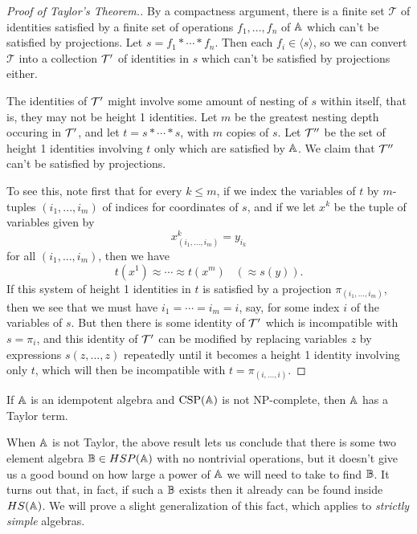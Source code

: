 \documentclass[letterpaper,11pt]{article}
\DeclareMathOperator{\CSP}{CSP}
\begin{document}
\begin{proof}[Proof of Taylor's Theorem.] By a compactness argument, there is a finite set $\mathcal{T}$ of identities satisfied by a finite set of operations $f_1, ..., f_n$ of $\mathbb{A}$ which can't be satisfied by projections. Let $s = f_1 * \cdots * f_n$. Then each $f_i \in \langle s \rangle$, so we can convert $\mathcal{T}$ into a collection $\mathcal{T}'$ of identities in $s$ which can't be satisfied by projections either.

The identities of $\mathcal{T}'$ might involve some amount of nesting of $s$ within itself, that is, they may not be height 1 identities. Let $m$ be the greatest nesting depth occuring in $\mathcal{T}'$, and let $t = s * \cdots * s$, with $m$ copies of $s$. Let $\mathcal{T}''$ be the set of height 1 identities involving $t$ only which are satisfied by $\mathbb{A}$. We claim that $\mathcal{T}''$ can't be satisfied by projections.

To see this, note first that for every $k \le m$, if we index the variables of $t$ by $m$-tuples $(i_1, ..., i_m)$ of indices for coordinates of $s$, and if we let $x^k$ be the tuple of variables given by
\[
x^k_{(i_1, ..., i_m)} = y_{i_k}
\]
for all $(i_1, ..., i_m)$, then we have
\[
t(x^1) \approx \cdots \approx t(x^m) \;\;\; (\approx s(y)).
\]
If this system of height 1 identities in $t$ is satisfied by a projection $\pi_{(i_1, ..., i_m)}$, then we see that we must have $i_1 = \cdots = i_m = i$, say, for some index $i$ of the variables of $s$. But then there is some identity of $\mathcal{T}'$ which is incompatible with $s = \pi_i$, and this identity of $\mathcal{T}'$ can be modified by replacing variables $z$ by expressions $s(z,...,z)$ repeatedly until it becomes a height 1 identity involving only $t$, which will then be incompatible with $t = \pi_{(i,...,i)}$.
\end{proof}

\begin{cor} If $\mathbb{A}$ is an idempotent algebra and $\CSP(\bA)$ is not NP-complete, then $\mathbb{A}$ has a Taylor term.
\end{cor}

When $\mathbb{A}$ is not Taylor, the above result lets us conclude that there is some two element algebra $\mathbb{B} \in HSP(\mathbb{A})$ with no nontrivial operations, but it doesn't give us a good bound on how large a power of $\mathbb{A}$ we will need to take to find $\mathbb{B}$. It turns out that, in fact, if such a $\mathbb{B}$ exists then it already can be found inside $HS(\mathbb{A})$. We will prove a slight generalization of this fact, which applies to \emph{strictly simple} algebras.
\end{document}
